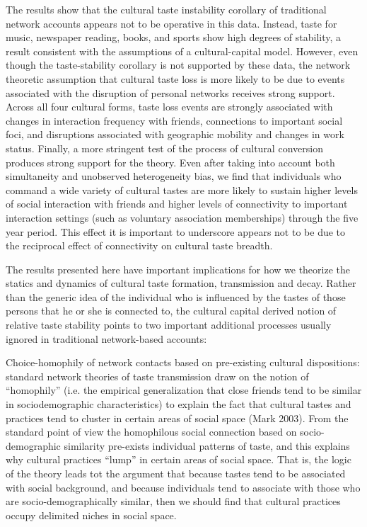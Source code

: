 The results show that the cultural taste instability corollary of traditional network accounts appears not to be operative in this data. Instead, taste for music, newspaper reading, books, and sports show high degrees of stability, a result consistent with the assumptions of a cultural-capital model. However, even though the taste-stability corollary is not supported by these data, the network theoretic assumption that cultural taste loss is more likely to be due to events associated with the disruption of personal networks receives strong support. Across all four cultural forms, taste loss events are strongly associated with changes in interaction frequency with friends, connections to important social foci, and disruptions associated with geographic mobility and changes in work status. Finally, a more stringent test of the process of cultural conversion produces strong support for the theory. Even after taking into account both simultaneity and unobserved heterogeneity bias, we find that individuals who command a wide variety of cultural tastes are more likely to sustain higher levels of social interaction with friends and higher levels of connectivity to important interaction settings (such as voluntary association memberships) through the five year period. This effect it is important to underscore appears not to be due to the reciprocal effect of connectivity on cultural taste breadth.

The results presented here have important implications for how we theorize the statics and dynamics of cultural taste formation, transmission and decay. Rather than the generic idea of the individual who is influenced by the tastes of those persons that he or she is connected to, the cultural capital derived notion of relative taste stability points to two important additional processes usually ignored in traditional network-based accounts:

Choice-homophily of network contacts based on pre-existing cultural dispositions: standard network theories of taste transmission draw on the notion of “homophily” (i.e. the empirical generalization that close friends tend to be similar in sociodemographic characteristics) to explain the fact that cultural tastes and practices tend to cluster in certain areas of social space (Mark 2003). From the standard point of view the homophilous social connection based on socio-demographic similarity pre-exists individual patterns of taste, and this explains why cultural practices “lump” in certain areas of social space. That is, the logic of the theory leads tot the argument that because tastes tend to be associated with social background, and because individuals tend to associate with those who are socio-demographically similar, then we should find that cultural practices occupy delimited niches in social space.

